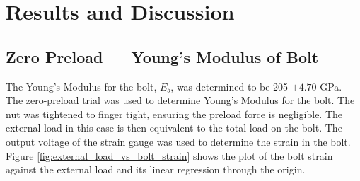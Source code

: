 \section{Results and Discussion}
\subsection{Zero Preload --- Young's Modulus of Bolt}
\label{sec:zero_preload_youngs_modulus}
The Young's Modulus for the bolt, $E_b$, was determined to be 205 $\pm 4.70$ GPa. The zero-preload trial was used to determine Young's Modulus for the bolt. The nut was tightened to finger tight, ensuring the preload force is negligible. The external load in this case is then equivalent to the total load on the bolt. The output voltage of the strain gauge was used to determine the strain in the bolt. Figure \ref{fig:external_load_vs_bolt_strain} shows the plot of the bolt strain against the external load and its linear regression through the origin. 
